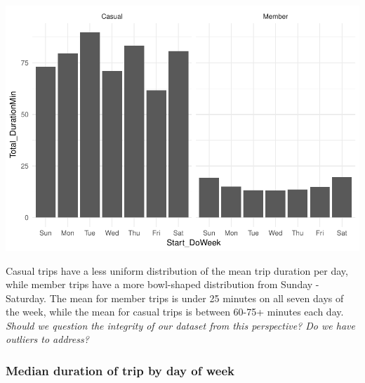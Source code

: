\documentclass[]{article}
\newenvironment{Shaded}{\begin{snugshade}}{\end{snugshade}}
\newcommand{\KeywordTok}[1]{\textcolor[rgb]{0.13,0.29,0.53}{\textbf{#1}}}
\newcommand{\DataTypeTok}[1]{\textcolor[rgb]{0.13,0.29,0.53}{#1}}
\newcommand{\StringTok}[1]{\textcolor[rgb]{0.31,0.60,0.02}{#1}}
\newcommand{\OperatorTok}[1]{\textcolor[rgb]{0.81,0.36,0.00}{\textbf{#1}}}
\newcommand{\NormalTok}[1]{#1}
\begin{document}
\begin{Shaded}
\end{Shaded}

\includegraphics{Nice_Ride_Project_Stat_ReportDRAFT_files/figure-latex/unnamed-chunk-7-1.pdf}

Casual trips have a less uniform distribution of the mean trip duration
per day, while member trips have a more bowl-shaped distribution from
Sunday - Saturday. The mean for member trips is under 25 minutes on all
seven days of the week, while the mean for casual trips is between
60-75+ minutes each day. \emph{Should we question the integrity of our
dataset from this perspective? Do we have outliers to address?}

\subsubsection{Median duration of trip by day of
week}\label{median-duration-of-trip-by-day-of-week}
\end{document}
